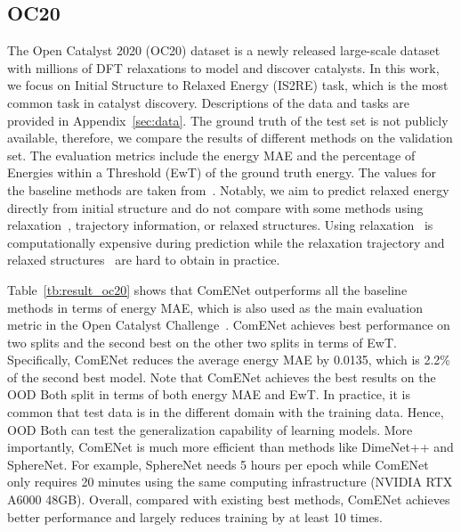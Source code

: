 \documentclass{article}
\begin{document}
\subsection{OC20} \label{sec:exp_oc20}
The Open Catalyst 2020 (OC20) dataset is a newly released large-scale dataset with millions of DFT relaxations to model and discover catalysts.
In this work, we focus on Initial Structure to Relaxed Energy (IS2RE) task, which is the most common task in catalyst discovery.
Descriptions of the data and tasks are provided in Appendix~\ref{sec:data}. 
The ground truth of the test set is not publicly available, 
therefore, we compare the results of different methods on the validation set. 
The evaluation metrics include the energy MAE and the percentage of Energies within a Threshold (EwT) of the ground truth energy. 
The values for the baseline methods are taken from~\citet{chanussot2021correction, liu2022spherical}.
Notably, we aim to predict relaxed energy directly from initial structure and do not compare with some methods using relaxation~\cite{chanussot2021open}, trajectory information, or relaxed structures.
Using relaxation~\citep{chanussot2021open,klicpera2021gemnet,shuaibi2021rotation} is computationally expensive during prediction 
while the relaxation trajectory and relaxed structures~\citep{godwin2021very,ying2021do} are hard to obtain in practice.


Table~\ref{tb:result_oc20} shows that ComENet outperforms all the baseline methods in terms of energy MAE, 
which is also used as the main evaluation metric in the Open Catalyst Challenge~\cite{occhallenge}. 
ComENet achieves best performance on two splits and the second best on the other two splits
in terms of EwT.
Specifically, ComENet reduces the average energy MAE by 0.0135, which is 2.2\% of the second best model. 
Note that ComENet achieves the best results on the OOD Both split in terms of both energy MAE and EwT.
In practice, it is common that test data is in the different domain with the training data.
Hence, OOD Both can test the generalization capability of learning models.
More importantly, ComENet is much more efficient than methods like DimeNet++ and SphereNet. 
For example, SphereNet needs 5 hours per epoch while ComENet only requires 20 minutes using the same computing infrastructure (NVIDIA RTX A6000 48GB). Overall, compared with existing best methods,
ComENet achieves better performance and largely reduces training by at least 10 times.
\end{document}
